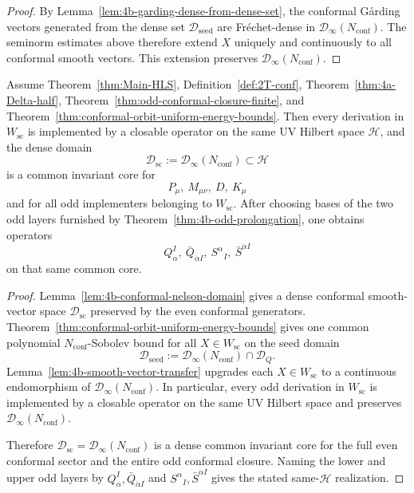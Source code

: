 \begin{proof}
By Lemma~\ref{lem:4b-garding-dense-from-dense-set}, the conformal G\r{a}rding
vectors generated from the dense set \(\mathcal D_{\mathrm{seed}}\) are
Fr\'echet-dense in
\(\mathcal D_\infty(N_{\mathrm{conf}})\). The seminorm estimates above therefore
extend \(X\) uniquely and continuously to all conformal smooth vectors. This
extension preserves \(\mathcal D_\infty(N_{\mathrm{conf}})\).
\end{proof}

\begin{theorem}
\label{thm:4b-narrow-common-sector}
\label{thm:odd-conformal-closure-implementable}
Assume Theorem~\ref{thm:Main-HLS},
Definition~\ref{def:2T-conf},
Theorem~\ref{thm:4a-Delta-half},
Theorem~\ref{thm:odd-conformal-closure-finite}, and
Theorem~\ref{thm:conformal-orbit-uniform-energy-bounds}. Then every derivation in
\(W_{\mathrm{sc}}\) is implemented by a closable operator on the same UV Hilbert
space \(\mathcal H\), and the dense domain
\[
\mathcal D_{\mathrm{sc}}
:=
\mathcal D_\infty(N_{\mathrm{conf}})
\subset\mathcal H
\]
is a common invariant core for
\[
P_\mu,\ M_{\mu\nu},\ D,\ K_\mu
\]
and for all odd implementers belonging to \(W_{\mathrm{sc}}\). After choosing
bases of the two odd layers furnished by Theorem~\ref{thm:4b-odd-prolongation},
one obtains operators
\[
Q_\alpha^I,\ \bar Q_{\dot\alpha I},\ S^\alpha{}_I,\ \bar S^{\dot\alpha I}
\]
on that same common core.
\end{theorem}

\begin{proof}
Lemma~\ref{lem:4b-conformal-nelson-domain} gives a dense conformal smooth-vector
space \(\mathcal D_{\mathrm{sc}}\) preserved by the even conformal generators.
Theorem~\ref{thm:conformal-orbit-uniform-energy-bounds} gives one common
polynomial \(N_{\mathrm{conf}}\)-Sobolev bound for all
\(X\in W_{\mathrm{sc}}\) on the seed domain
\[
\mathcal D_{\mathrm{seed}}
:=
\mathcal D_\infty(N_{\mathrm{conf}})\cap\mathcal D_Q.
\]
Lemma~\ref{lem:4b-smooth-vector-transfer} upgrades each
\(X\in W_{\mathrm{sc}}\) to a continuous endomorphism of
\(\mathcal D_\infty(N_{\mathrm{conf}})\). In particular, every odd derivation in
\(W_{\mathrm{sc}}\) is implemented by a closable operator on the same UV Hilbert
space and preserves \(\mathcal D_\infty(N_{\mathrm{conf}})\).

Therefore \(\mathcal D_{\mathrm{sc}}=\mathcal D_\infty(N_{\mathrm{conf}})\) is a
dense common invariant core for the full even conformal sector and the entire odd
conformal closure. Naming the lower and upper odd layers by
\(Q_\alpha^I,\bar Q_{\dot\alpha I}\) and \(S^\alpha{}_I,\bar S^{\dot\alpha I}\)
gives the stated same-\(\mathcal H\) realization.
\end{proof}

